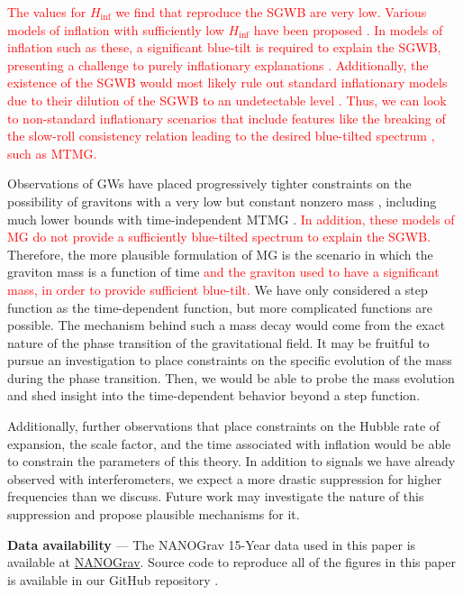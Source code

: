\documentclass[prd,twocolumn,aps,psfig,nofootinbib,nobibnotes,superscriptaddress,preprintnumbers,times]{revtex4-2}
\def\red{\textcolor{red}}
\begin{document}
\red{The values for $H_{\inf}$ we find that reproduce the SGWB are very low. Various models of inflation with sufficiently low $H_{\inf}$ have been proposed \cite{Nakayama:2011ri, Takahashi:2018tdu, Drees:2021wgd}. In models of inflation such as these, a significant blue-tilt is required to explain the SGWB, presenting a challenge to purely inflationary explanations \cite{Vagnozzi:2023lwo}. Additionally, the existence of the SGWB would most likely rule out standard inflationary models due to their dilution of the SGWB to an undetectable level \cite{Vagnozzi:2022qmc}. Thus, we can look to non-standard inflationary scenarios that include features like the breaking of the slow-roll consistency relation leading to the desired blue-tilted spectrum \cite{EPTA:2023xxk}, such as MTMG.}

Observations of GWs have placed progressively tighter constraints on the possibility of gravitons with a very low but constant nonzero mass \cite{Bernardo:2023mxc, Wu:2023rib, Wang:2023div, deRham:2016nuf}, including much lower bounds with time-independent MTMG \cite{DeFelice:2021trp, DeFelice:2023bwq}. \red{In addition, these models of MG do not provide a sufficiently blue-tilted spectrum to explain the SGWB.} Therefore, the more plausible formulation of MG is the scenario in which the graviton mass is a function of time \red{and the graviton used to have a significant mass, in order to provide sufficient blue-tilt.} We have only considered a step function as the time-dependent function, but more complicated functions are possible. The mechanism behind such a mass decay would come from the exact nature of the phase transition of the gravitational field. It may be fruitful to pursue an investigation to place constraints on the specific evolution of the mass during the phase transition. Then, we would be able to probe the mass evolution and shed insight into the time-dependent behavior beyond a step function.

Additionally, further observations that place constraints on the Hubble rate of expansion, the scale factor, and the time associated with inflation would be able to constrain the parameters of this theory. In addition to signals we have already observed with interferometers, we expect a more drastic suppression for higher frequencies than we discuss. Future work may investigate the nature of this suppression and propose plausible mechanisms for it.

\vspace{2mm}
{\bf Data availability} --- The NANOGrav 15-Year data used in this paper is available at \href{https://nanograv.org/science/data}{NANOGrav}. Source code to reproduce all of the figures in this paper is available in our GitHub repository \cite{GH}. 
\end{document}
